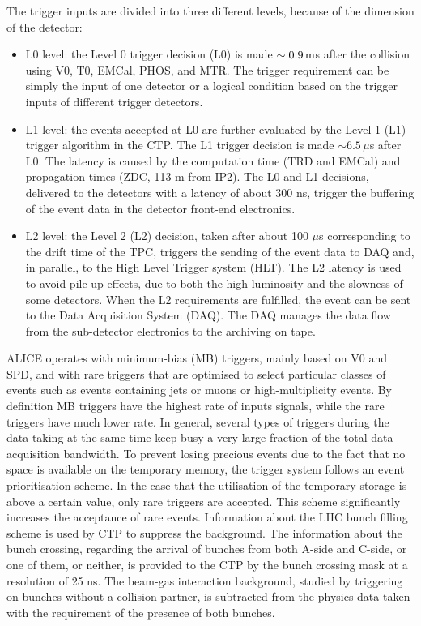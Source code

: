 The trigger inputs are divided into three different levels, 
because of the dimension of the detector:
\begin{itemize}
\item L0 level: the Level 0 trigger decision (L0) is made $\sim 0.9\, \mathrm{m}$s after the 
collision using V0, T0, EMCal, PHOS, and MTR. The trigger requirement can be 
simply the input of one detector or a logical condition based on the trigger 
inputs of different trigger detectors.
\item L1 level: the events accepted at L0 are further evaluated by the Level 1 (L1) 
trigger algorithm in the CTP. The L1 trigger decision is made $\sim 6.5\, \mu$s after L0. 
The latency is caused by the computation time (TRD and EMCal) and propagation times 
(ZDC, 113 m from IP2). The L0 and L1 decisions, delivered to the detectors with a 
latency of about 300 ns, trigger the buffering of the event data in the detector front-end electronics. 
\item L2 level: the Level 2 (L2) decision, taken after about 100 $\mu$s corresponding to the 
drift time of the TPC, triggers the sending of the event data to DAQ and, in parallel, to the High Level Trigger system (HLT). 
The L2 latency is used to avoid pile-up effects, due to both the high luminosity and the slowness of some 
detectors. When the L2 requirements are fulfilled, the event can be sent to the Data Acquisition 
System (DAQ). The DAQ manages the data flow from the sub-detector electronics to the archiving on tape.
\end{itemize}
ALICE operates with minimum-bias (MB) triggers, mainly based on V0 and SPD, 
and with rare triggers that are optimised to select particular classes of events such as 
events containing jets or muons or high-multiplicity events. By definition MB triggers 
have the highest rate of inputs signals, while the rare triggers have much lower rate. 
In general, several types of triggers during the data taking at the same time keep busy a 
very large fraction of the total data acquisition bandwidth. To prevent losing precious events due to the fact that no 
space is available on the temporary memory, the trigger system follows an event prioritisation scheme. 
In the case that the utilisation of the temporary storage is above a certain 
value, only rare triggers are accepted. This scheme significantly increases the acceptance of rare events.
Information about the LHC bunch filling scheme is used by CTP to suppress the background. 
The information about the bunch crossing, regarding the arrival of bunches from both A-side and C-side,
or one of them, or neither, is provided to the CTP by the bunch crossing mask at a resolution of 25 ns. 
The beam-gas interaction background, studied by triggering on bunches without a collision partner, is 
subtracted from the physics data taken with the requirement of the presence of both bunches.

